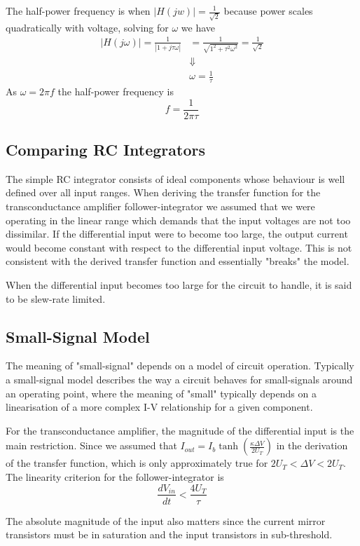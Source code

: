 The half-power frequency is when \(|H(jw)|=\frac{1}{\sqrt{2}}\) because power scales quadratically with voltage, solving for \(\omega\) we have
\begin{align*}
    |H(j\omega)| = \frac{1}{|1+j\tau\omega|} &= \frac{1}{\sqrt{1^2+\tau^2\omega^2}} = \frac{1}{\sqrt{2}} \\
    &\Downarrow \\
    &\omega = \frac{1}{\tau}
\end{align*}
As \(\omega = 2\pi f\) the half-power frequency is
\begin{equation*}
    f = \frac{1}{2\pi\tau}
\end{equation*}

\subsection{Comparing RC Integrators}
The simple RC integrator consists of ideal components whose behaviour is well defined over all input ranges. When deriving the transfer function
for the transconductance amplifier follower-integrator we assumed that we were operating in the linear range which demands that the input voltages
are not too dissimilar. If the differential input were to become too large, the output current would become constant with respect to the differential
input voltage. This is not consistent with the derived transfer function and essentially "breaks" the model. 

When the differential input becomes too large for the circuit to handle, it is said to be slew-rate limited.

\subsection{Small-Signal Model}
The meaning of "small-signal" depends on a model of circuit operation. Typically a small-signal model describes the way a circuit behaves for 
small-signals around an operating point, where the meaning of "small" typically depends on a linearisation of a more complex I-V relationship for
a given component.

For the transconductance amplifier, the magnitude of the differential input is the main restriction. Since we assumed that \(I_{out}=I_b\tanh\left(\frac{\kappa \Delta V}{2U_T}\right)\)
in the derivation of the transfer function, which is only approximately true for \(2U_T<\Delta V < 2U_T\).
The linearity criterion for the follower-integrator is
\begin{equation*}
    \frac{dV_{in}}{dt} < \frac{4U_T}{\tau}
\end{equation*}

The absolute magnitude of the input also matters since the current mirror transistors must be in saturation and the input transistors in sub-threshold.

